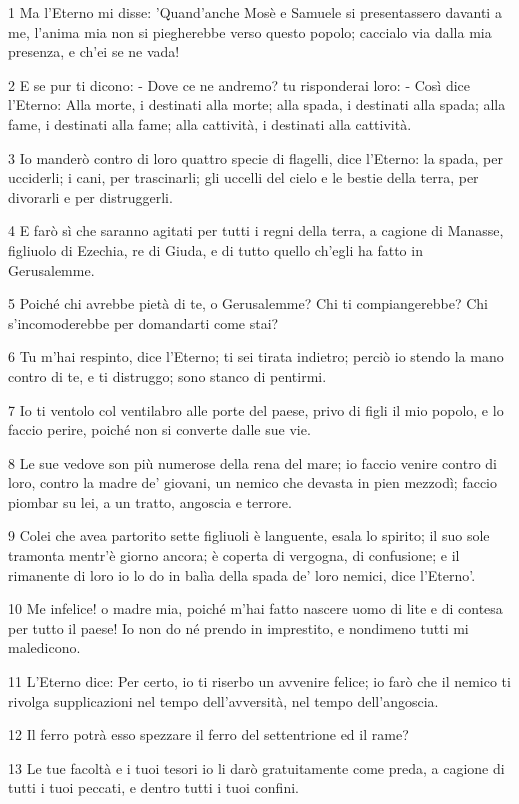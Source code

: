 \par 1 Ma l'Eterno mi disse: 'Quand'anche Mosè e Samuele si presentassero davanti a me, l'anima mia non si piegherebbe verso questo popolo; caccialo via dalla mia presenza, e ch'ei se ne vada!
\par 2 E se pur ti dicono: - Dove ce ne andremo? tu risponderai loro: - Così dice l'Eterno: Alla morte, i destinati alla morte; alla spada, i destinati alla spada; alla fame, i destinati alla fame; alla cattività, i destinati alla cattività.
\par 3 Io manderò contro di loro quattro specie di flagelli, dice l'Eterno: la spada, per ucciderli; i cani, per trascinarli; gli uccelli del cielo e le bestie della terra, per divorarli e per distruggerli.
\par 4 E farò sì che saranno agitati per tutti i regni della terra, a cagione di Manasse, figliuolo di Ezechia, re di Giuda, e di tutto quello ch'egli ha fatto in Gerusalemme.
\par 5 Poiché chi avrebbe pietà di te, o Gerusalemme? Chi ti compiangerebbe? Chi s'incomoderebbe per domandarti come stai?
\par 6 Tu m'hai respinto, dice l'Eterno; ti sei tirata indietro; perciò io stendo la mano contro di te, e ti distruggo; sono stanco di pentirmi.
\par 7 Io ti ventolo col ventilabro alle porte del paese, privo di figli il mio popolo, e lo faccio perire, poiché non si converte dalle sue vie.
\par 8 Le sue vedove son più numerose della rena del mare; io faccio venire contro di loro, contro la madre de' giovani, un nemico che devasta in pien mezzodì; faccio piombar su lei, a un tratto, angoscia e terrore.
\par 9 Colei che avea partorito sette figliuoli è languente, esala lo spirito; il suo sole tramonta mentr'è giorno ancora; è coperta di vergogna, di confusione; e il rimanente di loro io lo do in balìa della spada de' loro nemici, dice l'Eterno'.
\par 10 Me infelice! o madre mia, poiché m'hai fatto nascere uomo di lite e di contesa per tutto il paese! Io non do né prendo in imprestito, e nondimeno tutti mi maledicono.
\par 11 L'Eterno dice: Per certo, io ti riserbo un avvenire felice; io farò che il nemico ti rivolga supplicazioni nel tempo dell'avversità, nel tempo dell'angoscia.
\par 12 Il ferro potrà esso spezzare il ferro del settentrione ed il rame?
\par 13 Le tue facoltà e i tuoi tesori io li darò gratuitamente come preda, a cagione di tutti i tuoi peccati, e dentro tutti i tuoi confini.

